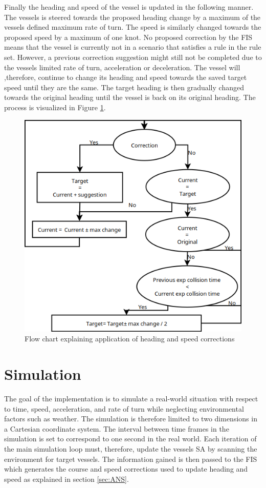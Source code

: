 Finally the heading and speed of the vessel is updated in the following manner. The vessels is steered towards the proposed heading change by a maximum of the vessels defined maximum rate of turn. The speed is similarly changed towards the proposed speed by a maximum of one knot. No proposed correction by the FIS means that the vessel is currently not in a scenario that satisfies a rule in the rule set. However, a previous correction suggestion might still not be completed due to the vessels limited rate of turn, acceleration or deceleration.  The vessel will ,therefore, continue to change its heading and speed towards the saved target speed until they are the same.  The target heading is then gradually changed towards the original heading until the vessel is back on its original heading. The process is visualized in Figure \ref{fig:flow_chart}.
\begin{figure}[H]
    \centering
    \includegraphics[width=\textwidth,height=0.75\textheight,keepaspectratio]{Figures/flow.png}
    \caption{Flow chart explaining application of heading and speed corrections}
    \label{fig:flow_chart}
\end{figure}

\section{Simulation}
The goal of the implementation is to  simulate a real-world situation with respect to time, speed, acceleration, and rate of turn while neglecting  environmental factors such as weather.
The simulation is therefore limited to two dimensions in a Cartesian coordinate system.
The interval between time frames in the simulation is set to correspond to one second in the real world.
Each iteration of the main simulation loop must, therefore, update the vessels SA by scanning the environment for target vessels. The information gained is then passed to the FIS which generates the course and speed corrections used to update heading and speed as explained in section \ref{sec:ANS}.

